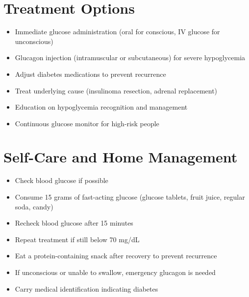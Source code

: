 \section*{Treatment Options}
\begin{itemize}
\item Immediate glucose administration (oral for conscious, IV glucose for unconscious)
\item Glucagon injection (intramuscular or subcutaneous) for severe hypoglycemia
\item Adjust diabetes medications to prevent recurrence
\item Treat underlying cause (insulinoma resection, adrenal replacement)
\item Education on hypoglycemia recognition and management
\item Continuous glucose monitor for high-risk people
\end{itemize}

\section*{Self-Care and Home Management}
\begin{itemize}
\item Check blood glucose if possible
\item Consume 15 grams of fast-acting glucose (glucose tablets, fruit juice, regular soda, candy)
\item Recheck blood glucose after 15 minutes
\item Repeat treatment if still below 70 mg/dL
\item Eat a protein-containing snack after recovery to prevent recurrence
\item If unconscious or unable to swallow, emergency glucagon is needed
\item Carry medical identification indicating diabetes
\end{itemize}

